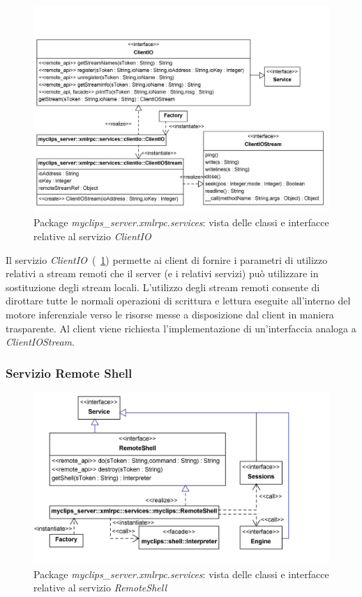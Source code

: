 \begin{figure}[h]
\centering
\includegraphics[width=1\textwidth]{Immagini/Capitolo3/Classi/myclips_server_services_ClientIO.png}
\caption{Package \emph{myclips\_server.xmlrpc.services}: vista delle classi e interfacce relative al servizio \emph{ClientIO}}\label{fig:class-myclips-server-services-clientio}
\end{figure}

Il servizio \emph{ClientIO}~(\figurename~\ref{fig:class-myclips-server-services-clientio}) permette ai client di fornire i parametri di utilizzo relativi a stream remoti che il server  (e i relativi servizi) può utilizzare in sostituzione degli stream locali. L'utilizzo degli stream remoti consente di dirottare tutte le normali operazioni di scrittura e lettura eseguite all'interno del motore inferenziale verso le risorse messe a disposizione dal client in maniera trasparente.
Al client viene richiesta l'implementazione di un'interfaccia analoga a \emph{ClientIOStream}.

\subsubsection{Servizio Remote Shell}

\begin{figure}[h]
\centering
\includegraphics[width=1\textwidth]{Immagini/Capitolo3/Classi/myclips_server_services_RemoteShell.png}
\caption{Package \emph{myclips\_server.xmlrpc.services}: vista delle classi e interfacce relative al servizio \emph{RemoteShell}}\label{fig:class-myclips-server-services-remoteshell}
\end{figure}

